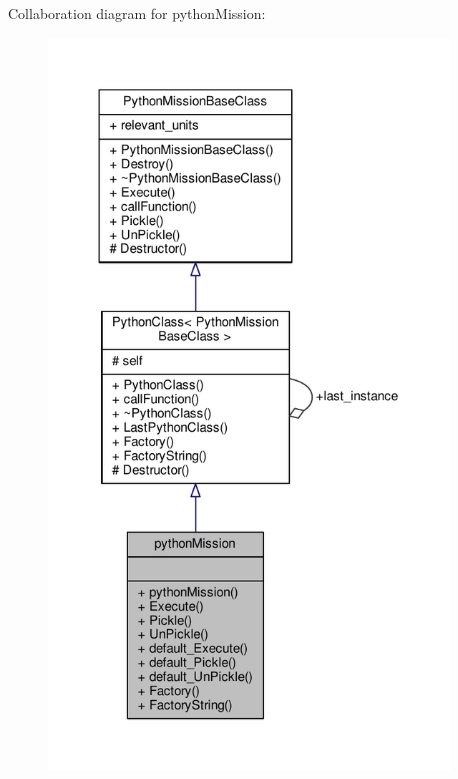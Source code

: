 Collaboration diagram for python\+Mission\+:
\nopagebreak
\begin{figure}[H]
\begin{center}
\leavevmode
\includegraphics[height=550pt]{da/d46/classpythonMission__coll__graph}
\end{center}
\end{figure}
